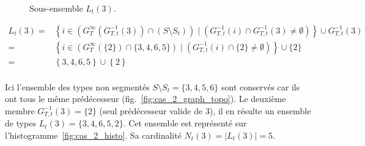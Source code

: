 \begin{figure}[!ht]
{		  
	      }\caption{Sous-ensemble $L_t(3)$.}
         \label{fig:cas_2}
	\end{figure}

	\begin{equation}
	 \begin{split}
	  L_t(3) = & \left\{ i \in \left( G_T^{\infty}(G_{T,t}^{-1}(3)) \cap ( S \setminus S_t ) \right)\;|\; \left( G_{T,t}^{-1} (i) \cap G_{T,t}^{-1} (3) \neq \emptyset \right) \right\} \cup  G_{T,t}^{-1}(3)\\
		 = & \left\{ i \in \left( G_T^{\infty}(\{2\}) 		\cap \{3,4,6,5\} 	 \right)\;|\; \left( G_{T,t}^{-1} (i) \cap \{2\} \neq \emptyset \right) \right\} \cup \{2\} \\
		 = & \left\{ 3,4,6,5 \right\} \cup \left\{ 2 \right\} \\
	 \end{split}
	 \label{eq:cas2}
	\end{equation}

	Ici l'ensemble des types non segmentés $S \setminus S_t = \{3,4,5,6\}$ sont conservés car ils ont tous le même prédécesseur (fig.~\ref{fig:cas_2_graph_topo}). Le deuxième membre $G_{T,t}^{-1}(3) = \{2\}$ (seul prédécesseur valide de 3), il en résulte un ensemble de types $L_t(3) = \{3,4,6,5,2\}$. Cet ensemble est représenté sur l'histogramme~\ref{fig:cas_2_histo}. Sa cardinalité $N_t(3) = \left|{L_t(3)}\right| = 5$.\vspace{1em}


